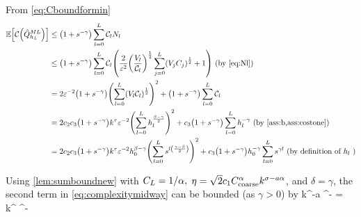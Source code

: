 From \cref{eq:Cboundformin}
\begin{align}
\EXP{\Cost{\QhatMLhL}} &\leq \mleft(1+s^{-\gamma}\mright)\sum_{l=0}^{L} \Cl \Nl\nonumber\\
&\leq \mleft(1+s^{-\gamma}\mright)\sum_{l=0}^L \Cl \mleft(\frac2{\eps^{2}} \mleft(\frac{\Vl}{\Cl}\mright)^{\half}\sum_{j=0}^L \mleft(\Vj\Cj\mright)^{\half} + 1\mright) \text{ (by \eqref{eq:Nl})}\nonumber\\
&= 2\eps^{-2}\mleft(1+s^{-\gamma}\mright)\mleft(\sum_{l=0}^L\mleft(\Vl\Cl\mright)^{\half}\mright)^2 + \mleft(1+s^{-\gamma}\mright)\sum_{l=0}^L \Cl\nonumber\\
&= 2 \ct \cth \mleft(1+s^{-\gamma}\mright)k^{\tau}\eps^{-2} \mleft(\sum_{l=0}^L \hl^{\frac{\beta-\gamma}2}\mright)^2 + \cth \mleft(1+s^{-\gamma}\mright) \sum_{l=0}^L \hl^{-\gamma} \text{ (by \cref{ass:b,ass:costone})}\nonumber\\
&= 2 \ct\cth \mleft(1+s^{-\gamma}\mright)k^{\tau}\eps^{-2}\hz^{\beta-\gamma}\mleft(\sum_{l=0}^L s^{l\mleft(\frac{\gamma-\beta}2\mright)}\mright)^2 + \cth\mleft(1+s^{-\gamma}\mright) \hz^{-\gamma} \sum_{l=0}^L s^{\gamma l} \text{ (by definition of } \hl\text{ )}\label{eq:complexitymidway}\\
\end{align}

Using \cref{lem:sumboundnew} with $C_{L} = 1/\alpha,$ $\eta = \sqrt{2}c_{1}C_{\mathrm{coarse}}^\alpha k^{\sigma - a\alpha}$, and $\delta = \gamma$, the second term in \eqref{eq:complexitymidway} can be bounded (as $\gamma > 0$) by %
\beq\label{eq:firstterm}
\cth{} k^{\frac{\gamma\sigma}\alpha-a\gamma} \eps^{-\frac\gamma\alpha}
=  k^{\frac{\gamma\sigma}\alpha} \eps^{-\frac\gamma\alpha}
\eeq

